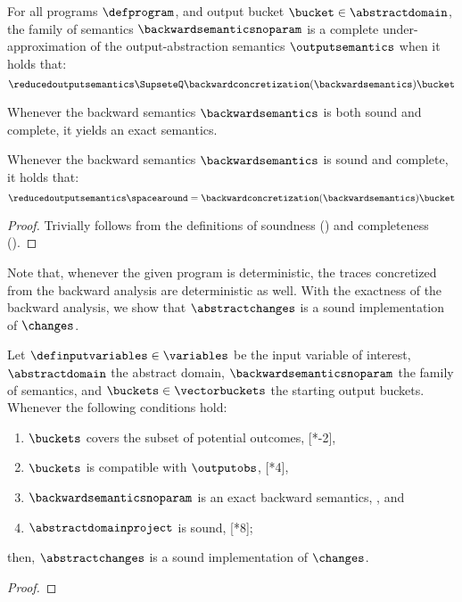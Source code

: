 \begin{definition}
  For all programs $\defprogram$, and output bucket $\bucket\in\abstractdomain$, the family of semantics $\backwardsemanticsnoparam$ is a \textup{complete under-approximation} of the output-abstraction semantics $\outputsemantics$
  when it holds that:
  \[\reducedoutputsemantics \SupseteQ \backwardconcretization(\backwardsemantics)\bucket\]
\end{definition}

Whenever the backward semantics $\backwardsemantics$ is both sound and complete, it yields an exact semantics.

\begin{lemma}
  Whenever the backward semantics $\backwardsemantics$ is sound and complete, it holds that:
  \[\reducedoutputsemantics \spacearound= \backwardconcretization(\backwardsemantics)\bucket\]
\end{lemma}
\begin{proof}
  Trivially follows from the definitions of soundness () and completeness ().
\end{proof}

Note that, whenever the given program is deterministic, the traces concretized from the backward analysis are deterministic as well.
With the exactness of the backward analysis, we show that $\abstractchanges$ is a sound implementation of $\changes$.

\begin{lemma}
  Let $\definputvariables\in\variables$ be the input variable of interest, $\abstractdomain$ the abstract domain, $\backwardsemanticsnoparam$ the family of semantics, and $\buckets\in\vectorbuckets$ the starting output buckets.
  Whenever the following conditions hold:
  \begin{enumerate}[label=(\roman*)]
    \item \label{tio1} $\buckets$ covers the subset of potential outcomes, \cf{} [*-2],
    \item \label{tio2} $\buckets$ is compatible with $\outputobs$, \cf{} [*4],
    \item \label{tio3} $\backwardsemanticsnoparam$ is an exact backward semantics, \cf{} , and
    \item \label{tio4} $\abstractdomainproject$ is sound, \cf{} [*8];
  \end{enumerate}
  then, $\abstractchanges$ is a sound implementation of $\changes$.
\end{lemma}
\begin{proof}
\end{proof}

